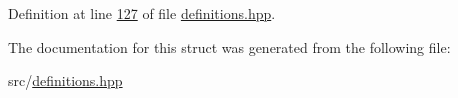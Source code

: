 Definition at line \hyperlink{definitions_8hpp_source_l00127}{127} of file \hyperlink{definitions_8hpp_source}{definitions.\+hpp}.



The documentation for this struct was generated from the following file\+:\begin{DoxyCompactItemize}
\item 
src/\hyperlink{definitions_8hpp}{definitions.\+hpp}\end{DoxyCompactItemize}

